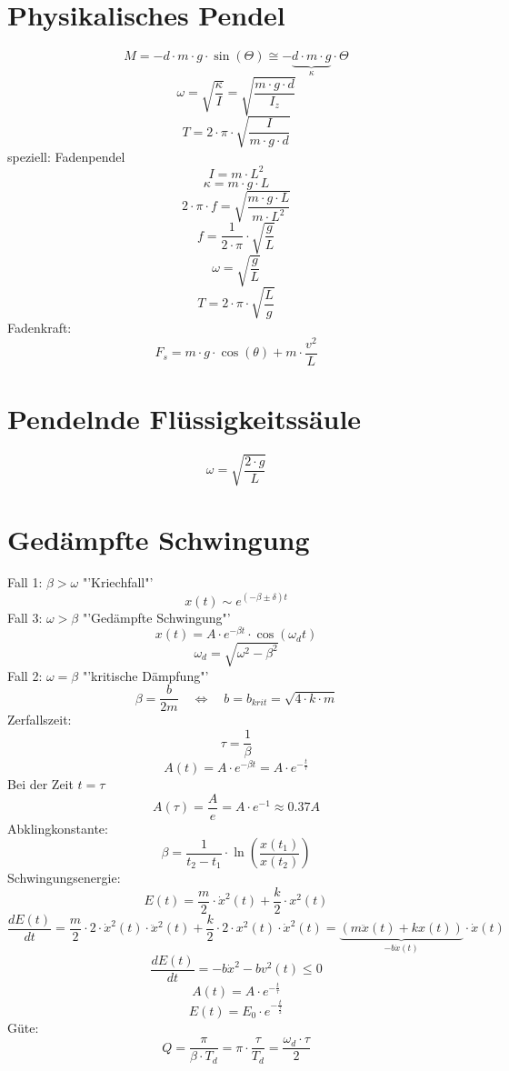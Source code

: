 \section{Physikalisches Pendel}
\[ \boxed{M = -d \cdot m \cdot g \cdot \sin(\Theta) 
\cong - \underbrace{d \cdot m \cdot g}_{\kappa} \cdot \Theta} \]
\[ \boxed{\omega = \sqrt{\frac{\kappa}{I}} 
= \sqrt{\frac{m \cdot g \cdot d}{I_z}}} \]
\[ \boxed{T = 2 \cdot \pi \cdot \sqrt{\frac{I}{m \cdot g \cdot d}}} \]
speziell: Fadenpendel
\[ \boxed{I = m \cdot L^2} \]
\[ \boxed{\kappa = m \cdot g \cdot L} \]
\[ \boxed{2 \cdot \pi \cdot f = \sqrt{\frac{m \cdot g \cdot L}{m \cdot L^2}}} \]
\[ \boxed{f = \frac{1}{2 \cdot \pi} \cdot \sqrt{\frac{g}{L}}} \]
\[ \boxed{\omega = \sqrt{\frac{g}{L}}} \]
\[ \boxed{T = 2 \cdot \pi \cdot \sqrt{\frac{L}{g}}} \]
Fadenkraft: 
\[ \boxed{F_s = m \cdot g \cdot \cos(\theta) + m \cdot \frac{v^2}{L}} \]

\section{Pendelnde Flüssigkeitssäule}
\[ \boxed{\omega = \sqrt{\frac{2 \cdot g}{L}}} \]

\section{Gedämpfte Schwingung}
Fall 1: $\beta > \omega$ "'Kriechfall"'
\[ \boxed{x(t) \sim e^{(-\beta \pm \delta)t}} \]
Fall 3: $\omega > \beta$ "'Gedämpfte Schwingung"'
\[ \boxed{x(t) = A \cdot e^{-\beta t} \cdot \cos(\omega_d t)} \]
\[ \boxed{\omega_d = \sqrt{\omega^2 - \beta^2}} \]
Fall 2: $\omega = \beta$ "'kritische Dämpfung"'
\[ \boxed{\beta = \frac{b}{2 m} \quad \Leftrightarrow \quad 
b = b_{krit} = \sqrt{4 \cdot k \cdot m}} \]
Zerfallszeit: 
\[ \boxed{\tau = \frac{1}{\beta}} \]
\[ \boxed{A(t) = A \cdot e^{-\beta t} = A \cdot e^{-\frac{t}{\tau}}} \]
Bei der Zeit $t = \tau$
\[ \boxed{A(\tau) = \frac{A}{e} = A \cdot e^{-1} \approx 0.37 A} \]
Abklingkonstante: 
\[ \boxed{\beta 
= \frac{1}{t_2 - t_1} \cdot \ln\left(\frac{x(t_1)}{x(t_2)}\right)} \]
Schwingungsenergie: 
\[ \boxed{E(t) = \frac{m}{2} \cdot \dot{x}^2(t) + \frac{k}{2} \cdot x^2(t)} \]
\[ \boxed{\frac{d E(t)}{dt} 
= \frac{m}{2} \cdot 2 \cdot \dot{x}^2(t) \cdot \ddot{x}^2(t) 
+ \frac{k}{2} \cdot 2 \cdot x^2(t) \cdot \dot{x}^2(t) 
= \underbrace{(m \ddot{x}(t) + k x(t))}_{-b \dot{x}(t)} \cdot \dot{x}(t)} \]
\[ \boxed{\frac{d E(t)}{dt} = -b \dot{x}^2 - b v^2(t) \leq 0} \]
\[ \boxed{A(t) = A \cdot e^{-\frac{t}{\tau}}} \]
\[ \boxed{E(t) = E_0 \cdot e^{-\frac{t}{\frac{\tau}{2}}}} \]
Güte: 
\[ \boxed{Q = \frac{\pi}{\beta \cdot T_d} = \pi \cdot \frac{\tau}{T_d} 
= \frac{\omega_d \cdot \tau}{2}} \]


